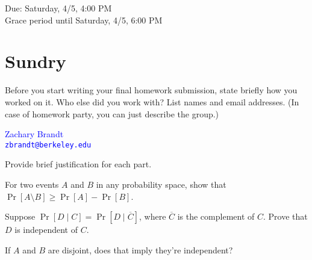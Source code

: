 \documentclass[11pt]{article}
\begin{document}
\maketitle
\fontsize{12}{15}\selectfont

\begin{center}
    Due: Saturday, 4/5, 4:00 PM \\
    Grace period until Saturday, 4/5, 6:00 PM \\
\end{center}

\section*{Sundry}
Before you start writing your final homework submission, state briefly how you 
worked on it.  Who else did you work with?  List names and email addresses. (In
case of homework party, you can just describe the group.)

\begin{center}
    \textcolor{blue}{
        Zachary Brandt \\
        \nolinkurl{zbrandt@berkeley.edu}
    }
\end{center}

\vspace{15pt}


Provide brief justification for each part.

\begin{Parts}

\Part For two events $A$ and $B$ in any probability space, show that $\Pr[A 
\setminus B] \geq \Pr[A] - \Pr[B]$.

\Part Suppose $\Pr[D \mid C] = \Pr[D \mid \overline{C}]$, where $\overline{C}$ 
is the complement of $C$. Prove that $D$ is independent of $C$.

\Part  If $A$ and $B$ are disjoint, does that imply they're independent?

\end{Parts}
\end{document}
